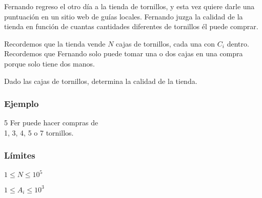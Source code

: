 Fernando regreso el otro día a la tienda de tornillos, y esta vez quiere darle una puntuación en un sitio web de guías locales. Fernando juzga la calidad de la tienda en función de cuantas cantidades diferentes de tornillos él puede comprar.

Recordemos que la tienda vende \(N\) cajas de tornillos, cada una con \(C_i\) dentro. Recordemos que Fernando solo puede tomar una o dos cajas en una compra porque solo tiene dos manos.

Dado las cajas de tornillos, determina la calidad de la tienda.

\subsubsection{Ejemplo}
\begin{casebox3}
	{5}
	{
		Fer puede hacer compras de \\
		1, 3, 4, 5 o 7 tornillos.
	}
\end{casebox3}

\subsubsection*{Límites}
\begin{plimits}
	\item \(1\leq N \leq 10^5\)
	\item \(1\leq A_i \leq 10^3\)
\end{plimits}